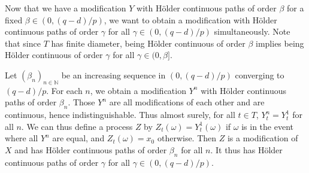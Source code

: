 \documentclass[lean]{Draft}
\begin{document}

Now that we have a modification $Y$ with Hölder continuous paths of order $\beta$ for a fixed $\beta \in (0, (q - d)/p)$, we want to obtain a modification with Hölder continuous paths of order $\gamma$ for all $\gamma \in (0, (q - d)/p)$ simultaneously.
Note that since $T$ has finite diameter, being Hölder continuous of order $\beta$ implies being Hölder continuous of order $\gamma$ for all $\gamma \in (0, \beta]$.

Let $(\beta_n)_{n \in \mathbb{N}}$ be an increasing sequence in $(0, (q - d)/p)$ converging to $(q - d)/p$.
For each $n$, we obtain a modification $Y^n$ with Hölder continuous paths of order $\beta_n$.
Those $Y^n$ are all modifications of each other and are continuous, hence indistinguishable.
Thus almost surely, for all $t \in T$, $Y^n_t = Y^1_t$ for all $n$.
We can thus define a process $Z$ by $Z_t(\omega) = Y^1_t(\omega)$ if $\omega$ is in the event where all $Y^n$ are equal, and $Z_t(\omega) = x_0$ otherwise.
Then $Z$ is a modification of $X$ and has Hölder continuous paths of order $\beta_n$ for all $n$.
It thus has Hölder continuous paths of order $\gamma$ for all $\gamma \in (0, (q - d)/p)$.
\end{document}
